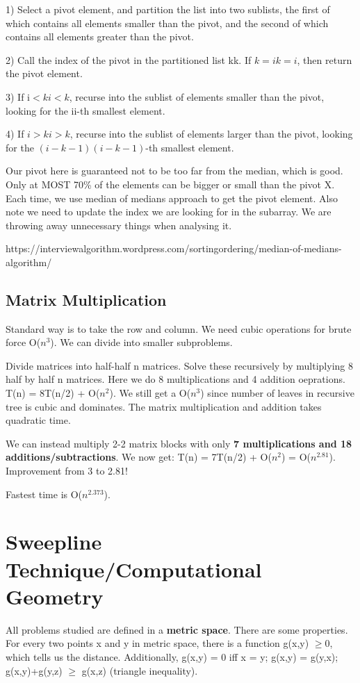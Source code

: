 \documentclass[11pt, oneside]{article}
\theoremstyle{definition}
\begin{document}
1) Select a pivot element, and partition the list into two sublists, the first of which contains all elements smaller than the pivot, and the second of which contains all elements greater than the pivot.

2) Call the index of the pivot in the partitioned list kk. If $k=ik=i$, then return the pivot element.

3) If i$<ki<k$, recurse into the sublist of elements smaller than the pivot, looking for the ii-th smallest element.

4) If $i>ki>k$, recurse into the sublist of elements larger than the pivot, looking for the $(i−k−1)(i−k−1)$-th smallest element.

Our pivot here is guaranteed not to be too far from the median, which is good. Only at MOST 70\% of the elements can be bigger or small than the pivot X. Each time, we use median of medians approach to get the pivot element. Also note we need to update the index we are looking for in the subarray. We are throwing away unnecessary things when analysing it.

https://interviewalgorithm.wordpress.com/sortingordering/median-of-medians-algorithm/

\subsection{Matrix Multiplication}
Standard way is to take the row and column. We need cubic operations for brute force O($n^3$). We can divide into smaller subproblems.

Divide matrices into half-half n matrices. Solve these recursively by multiplying 8 half by half n matrices. Here we do 8 multiplications and 4 addition oeprations. T(n) = 8T(n/2) + O($n^2$). We still get a O($n^3$) since number of leaves in recursive tree is cubic and dominates. The matrix multiplication and addition takes quadratic time.

We can instead multiply 2-2 matrix blocks with only \textbf{7 multiplications and 18 additions/subtractions}. We now get: T(n) = 7T(n/2) + O($n^2$) = O($n^{2.81}$). Improvement from 3 to 2.81!

Fastest time is O($n^{2.373}$).
\newpage
\section{Sweepline Technique/Computational Geometry}
All problems studied are defined in a \textbf{metric space}. There are some properties. For every two points x and y in metric space, there is a function g(x,y) $\geq 0$, which tells us the distance. Additionally, g(x,y) = 0 iff x = y; g(x,y) = g(y,x); g(x,y)+g(y,z) $\geq$ g(x,z) (triangle inequality).
\end{document}

